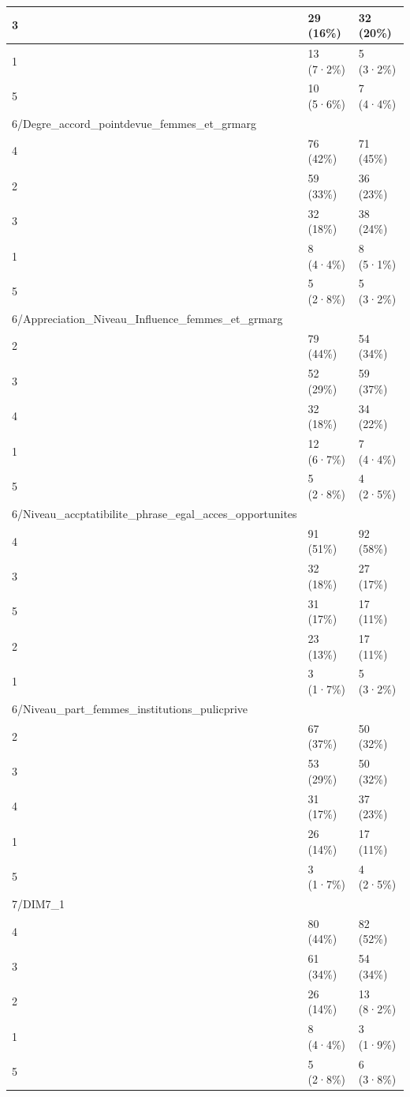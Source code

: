 \documentclass[
]{book}
\begin{document}
\begin{tabular}{l|l|l}
\hline
3 & 29 (16\%) & 32 (20\%)\\
\hline
1 & 13 (7·2\%) & 5 (3·2\%)\\
\hline
5 & 10 (5·6\%) & 7 (4·4\%)\\
\hline
6/Degre\_accord\_pointdevue\_femmes\_et\_grmarg &  & \\
\hline
4 & 76 (42\%) & 71 (45\%)\\
\hline
2 & 59 (33\%) & 36 (23\%)\\
\hline
3 & 32 (18\%) & 38 (24\%)\\
\hline
1 & 8 (4·4\%) & 8 (5·1\%)\\
\hline
5 & 5 (2·8\%) & 5 (3·2\%)\\
\hline
6/Appreciation\_Niveau\_Influence\_femmes\_et\_grmarg &  & \\
\hline
2 & 79 (44\%) & 54 (34\%)\\
\hline
3 & 52 (29\%) & 59 (37\%)\\
\hline
4 & 32 (18\%) & 34 (22\%)\\
\hline
1 & 12 (6·7\%) & 7 (4·4\%)\\
\hline
5 & 5 (2·8\%) & 4 (2·5\%)\\
\hline
6/Niveau\_accptatibilite\_phrase\_egal\_acces\_opportunites &  & \\
\hline
4 & 91 (51\%) & 92 (58\%)\\
\hline
3 & 32 (18\%) & 27 (17\%)\\
\hline
5 & 31 (17\%) & 17 (11\%)\\
\hline
2 & 23 (13\%) & 17 (11\%)\\
\hline
1 & 3 (1·7\%) & 5 (3·2\%)\\
\hline
6/Niveau\_part\_femmes\_institutions\_pulicprive &  & \\
\hline
2 & 67 (37\%) & 50 (32\%)\\
\hline
3 & 53 (29\%) & 50 (32\%)\\
\hline
4 & 31 (17\%) & 37 (23\%)\\
\hline
1 & 26 (14\%) & 17 (11\%)\\
\hline
5 & 3 (1·7\%) & 4 (2·5\%)\\
\hline
7/DIM7\_1 &  & \\
\hline
4 & 80 (44\%) & 82 (52\%)\\
\hline
3 & 61 (34\%) & 54 (34\%)\\
\hline
2 & 26 (14\%) & 13 (8·2\%)\\
\hline
1 & 8 (4·4\%) & 3 (1·9\%)\\
\hline
5 & 5 (2·8\%) & 6 (3·8\%)\\

\end{tabular}
\end{document}
